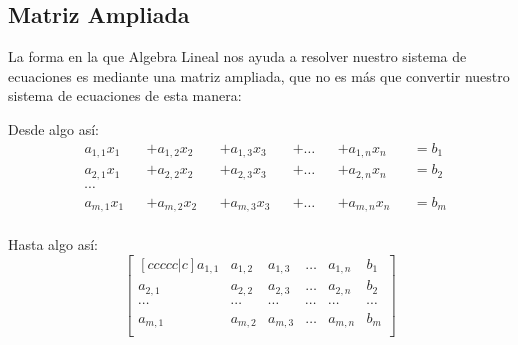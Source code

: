 \documentclass[12pt]{report}                                    %
\begin{document}
            \clearpage
            \subsection{Matriz Ampliada}
                La forma en la que Algebra Lineal nos ayuda a resolver nuestro sistema de ecuaciones
                es mediante una matriz ampliada, que no es más que convertir nuestro sistema
                de ecuaciones de esta manera:

                Desde algo así:
                \begin{equation}
                    \begin{split}
                        & a_{1,1}x_1 &&+ a_{1,2}x_2 &&+ a_{1,3}x_3 &&+ \dots &&+ a_{1,n}x_n &&= b_1 \\
                        & a_{2,1}x_1 &&+ a_{2,2}x_2 &&+ a_{2,3}x_3 &&+ \dots &&+ a_{2,n}x_n &&= b_2 \\
                        & \cdots                                                                    \\
                        & a_{m,1}x_1 &&+ a_{m,2}x_2 &&+ a_{m,3}x_3 &&+ \dots &&+ a_{m,n}x_n &&= b_m \\
                    \end{split}
                \end{equation}

                Hasta algo así:
                \begin{equation}
                    \begin{bmatrix}[ccccc|c]
                        a_{1,1} & a_{1,2} & a_{1,3} & \dots  & a_{1,n} & b_1     \\
                        a_{2,1} & a_{2,2} & a_{2,3} & \dots  & a_{2,n} & b_2     \\
                        \cdots  & \cdots  & \cdots  & \cdots & \cdots  & \cdots  \\
                        a_{m,1} & a_{m,2} & a_{m,3} & \dots  & a_{m,n} & b_m     \\
                    \end{bmatrix}
                \end{equation}


\end{document}
